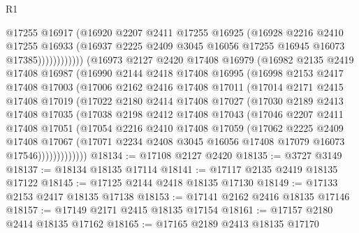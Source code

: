 \begin{lexlean}{R1}
\begin{coremodule}
                      @17255
                      @16917
                      (@16920
                        @2207
                        @2411
                        @17255
                        @16925
                        (@16928
                          @2216
                          @2410
                          @17255
                          @16933
                          (@16937 @2225 @2409 @3045 @16056 @17255 @16945 @16073 @17385))))))))))))
    (@16973
      @2127
      @2420
      @17408
      @16979
      (@16982
        @2135
        @2419
        @17408
        @16987
        (@16990
          @2144
          @2418
          @17408
          @16995
          (@16998
            @2153
            @2417
            @17408
            @17003
            (@17006
              @2162
              @2416
              @17408
              @17011
              (@17014
                @2171
                @2415
                @17408
                @17019
                (@17022
                  @2180
                  @2414
                  @17408
                  @17027
                  (@17030
                    @2189
                    @2413
                    @17408
                    @17035
                    (@17038
                      @2198
                      @2412
                      @17408
                      @17043
                      (@17046
                        @2207
                        @2411
                        @17408
                        @17051
                        (@17054
                          @2216
                          @2410
                          @17408
                          @17059
                          (@17062
                            @2225
                            @2409
                            @17408
                            @17067
                            (@17071
                              @2234
                              @2408
                              @3045
                              @16056
                              @17408
                              @17079
                              @16073
                              @17546)))))))))))))
@18134 := @17108 @2127 @2420
@18135 := @3727 @3149
@18137 := @18134 @18135 @17114
@18141 := @17117 @2135 @2419 @18135 @17122
@18145 := @17125 @2144 @2418 @18135 @17130
@18149 := @17133 @2153 @2417 @18135 @17138
@18153 := @17141 @2162 @2416 @18135 @17146
@18157 := @17149 @2171 @2415 @18135 @17154
@18161 := @17157 @2180 @2414 @18135 @17162
@18165 := @17165 @2189 @2413 @18135 @17170

\end{coremodule}
\end{lexlean}
